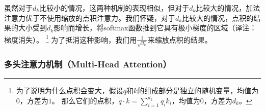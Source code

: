 虽然对于$d_k$比较小的情况，这两种机制的表现相似，但对于$d_k$比较大的情况，加法注意力优于不使用缩放的点积注意力\citep{DBLP:journals/corr/BritzGLL17}。我们怀疑，对于$d_k$比较大的情况，点积的结果的大小受到$d_k$影响而增长，将softmax函数推到它具有极小梯度的区域（译注：梯度消失）。
\footnote{为了说明为什么点积会变大，假设$q$和$k$的组成部分是独立的随机变量，均值为$0$，方差为$1$。 那么它们的点积，$q \cdot k = \sum_{i=1}^{d_k} q_ik_i$，均值为$0$，方差为$d_k$。}
为了抵消这种影响，我们用$\frac{1}{\sqrt{d_k}}$来缩放点积的结果。



\subsubsection{多头注意力机制（Multi-Head Attention）} \label{sec:multihead}


